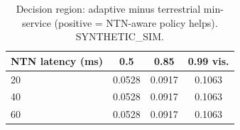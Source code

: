 \begin{table}[h]\centering
\caption{Decision region: adaptive minus terrestrial min-service (positive = NTN-aware policy helps). SYNTHETIC\_SIM.}
\begin{tabular}{lccc}\toprule
NTN latency (ms) & 0.5 & 0.85 & 0.99 vis. \\\midrule
20 & 0.0528 & 0.0917 & 0.1063 \\
40 & 0.0528 & 0.0917 & 0.1063 \\
60 & 0.0528 & 0.0917 & 0.1063 \\
\bottomrule\end{tabular}\end{table}
